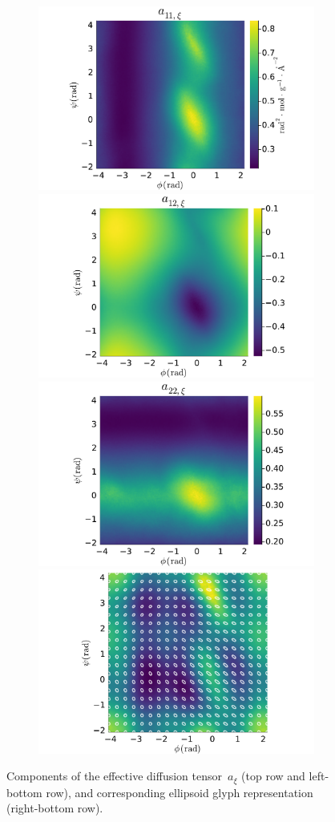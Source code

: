 \begin{figure}
    \begin{subfigure}{\linewidth}
        \includegraphics[width=0.49\linewidth]{figures/03/shape_optim_diala/a11.pdf}
        \includegraphics[width=0.49\linewidth]{figures/03/shape_optim_diala/a12.pdf}
        \includegraphics[width=0.49\linewidth]{figures/03/shape_optim_diala/a22.pdf}
        \includegraphics[width=0.49\linewidth]{figures/03/shape_optim_diala/metric.pdf}
    \end{subfigure}
    \caption[]{Components of the effective diffusion tensor~$a_\xi$ (top row and left-bottom row), and corresponding ellipsoid glyph representation (right-bottom row).}
    \label{03:fig:diffusion_tensor_diala}
\end{figure}

